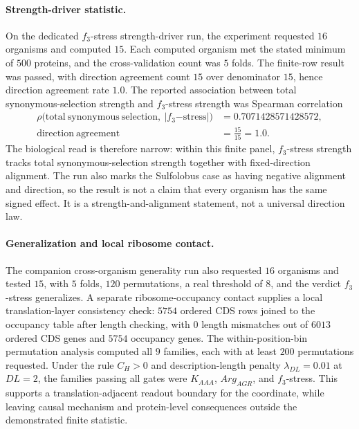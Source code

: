 \paragraph{Strength-driver statistic.}
On the dedicated $f_3$-stress strength-driver run, the experiment requested $16$ organisms and computed $15$.  Each computed organism met the stated minimum of $500$ proteins, and the cross-validation count was $5$ folds.  The finite-row result was passed, with direction agreement count $15$ over denominator $15$, hence direction agreement rate $1.0$.  The reported association between total synonymous-selection strength and $f_3$-stress strength was Spearman correlation
$$
\begin{aligned}
\rho\bigl(\mathrm{total\ synonymous\ selection},\ |f_3\mathrm{-stress}|\bigr) &= 0.7071428571428572,\\
\mathrm{direction\ agreement} &= \frac{15}{15}=1.0.
\end{aligned}
$$
The biological read is therefore narrow: within this finite panel, $f_3$-stress strength tracks total synonymous-selection strength together with fixed-direction alignment.  The run also marks the Sulfolobus case as having negative alignment and direction, so the result is not a claim that every organism has the same signed effect.  It is a strength-and-alignment statement, not a universal direction law.

\paragraph{Generalization and local ribosome contact.}
The companion cross-organism generality run also requested $16$ organisms and tested $15$, with $5$ folds, $120$ permutations, a real threshold of $8$, and the verdict $f_3$-stress generalizes.  A separate ribosome-occupancy contact supplies a local translation-layer consistency check: $5754$ ordered CDS rows joined to the occupancy table after length checking, with $0$ length mismatches out of $6013$ ordered CDS genes and $5754$ occupancy genes.  The within-position-bin permutation analysis computed all $9$ families, each with at least $200$ permutations requested.  Under the rule $C_H>0$ and description-length penalty $\lambda_{DL}=0.01$ at $DL=2$, the families passing all gates were $K_{AAA}$, $Arg_{AGR}$, and $f_3$-stress.  This supports a translation-adjacent readout boundary for the coordinate, while leaving causal mechanism and protein-level consequences outside the demonstrated finite statistic.

